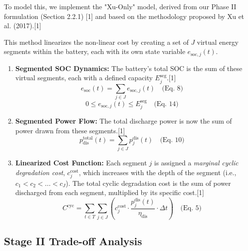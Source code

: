 \documentclass[11pt, a4paper]{article}
\begin{document}
To model this, we implement the "Xu-Only" model, derived from our Phase II formulation (Section 2.2.1) [1] and based on the methodology proposed by Xu et al. (2017).[1]

This method linearizes the non-linear cost by creating a set of $J$ virtual energy segments within the battery, each with its own state variable $e_{\mathrm{soc},j}(t)$.

\begin{enumerate}
    \item \textbf{Segmented SOC Dynamics:} The battery's total SOC is the sum of these virtual segments, each with a defined capacity $E^{\mathrm{seg}}_{j}$.[1]
    \begin{equation}
        e_{\mathrm{soc}}(t) = \sum_{j \in J} e_{\mathrm{soc},j}(t) \quad \text{(Eq. 8)}
    \end{equation}
    \begin{equation}
        0 \le e_{\mathrm{soc},j}(t) \le E^{\mathrm{seg}}_{j} \quad \text{(Eq. 14)}
    \end{equation}

    \item \textbf{Segmented Power Flow:} The total discharge power is now the sum of power drawn from these segments.[1]
    \begin{equation}
        p^{\mathrm{total}}_{\mathrm{dis}}(t) = \sum_{j \in J} p^{\mathrm{dis}}_{j}(t) \quad \text{(Eq. 10)}
    \end{equation}

    \item \textbf{Linearized Cost Function:} Each segment $j$ is assigned a \textit{marginal cyclic degradation cost}, $c^{\mathrm{cost}}_{j}$, which increases with the depth of the segment (i.e., $c_1 < c_2 <... < c_J$). The total cyclic degradation cost is the sum of power discharged from each segment, multiplied by its specific cost.[1]
    \begin{equation}
        C^{\mathrm{cyc}} = \sum_{t \in T} \sum_{j \in J} \left( c^{\mathrm{cost}}_{j} \cdot \frac{p^{\mathrm{dis}}_{j}(t)}{\eta_{\mathrm{dis}}} \cdot \Delta t \right) \quad \text{(Eq. 5)}
    \end{equation}
\end{enumerate}

\subsection{Stage II Trade-off Analysis}
\end{document}
